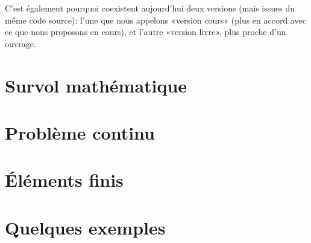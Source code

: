 \documentclass[11pt,pdflatex]{book}
\begin{document}
C'est également pourquoi coexistent aujourd'hui deux versions (mais issues du même code source):
l'une que nous appelons «version cours» (plus en accord avec ce que nous proposons en cours),
et l'autre «version livre», plus proche d'un ouvrage.


\cleardoublepage
\tableofcontents


 \part{Survol mathématique}
 
 
 
 
 
 

 \part{Problème continu}
 
 
 \ifVersionAvecExemplesSepares\else
 \fi

 \part{Éléments finis}
 
 
 

 
 
 
 
 
 
 

\ifVersionAvecExemplesSepares
    \part{Quelques exemples}
 \fi
\end{document}
